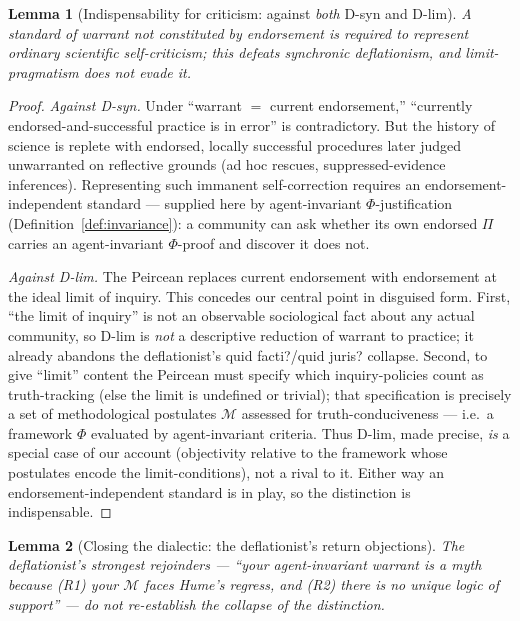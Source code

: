 \documentclass{amsart}
\theoremstyle{definition}
\theoremstyle{plain}
\newtheorem{lemma}{Lemma}
\theoremstyle{remark}
\begin{document}
\begin{lemma}[Indispensability for criticism: against \emph{both} D-syn and
D-lim]\label{lem:criticism}
A standard of warrant not constituted by endorsement is required to represent
ordinary scientific self-criticism; this defeats synchronic deflationism, and
limit-pragmatism does not evade it.
\end{lemma}

\begin{proof}
\emph{Against D-syn.} Under ``warrant $=$ current endorsement,'' ``currently
endorsed-and-successful practice is in error'' is contradictory. But the
history of science is replete with endorsed, locally successful procedures
later judged unwarranted on reflective grounds (ad hoc rescues,
suppressed-evidence inferences). Representing such immanent self-correction
requires an endorsement-independent standard --- supplied here by
agent-invariant $\Phi$-justification (Definition~\ref{def:invariance}): a
community can ask whether its own endorsed $\Pi$ carries an agent-invariant
$\Phi$-proof and discover it does not.

\emph{Against D-lim.} The Peircean replaces current endorsement with
endorsement at the ideal limit of inquiry. This concedes our central point in
disguised form. First, ``the limit of inquiry'' is not an observable
sociological fact about any actual community, so D-lim is \emph{not} a
descriptive reduction of warrant to practice; it already abandons the
deflationist's quid facti?/quid juris? collapse. Second, to give ``limit''
content the Peircean must specify which inquiry-policies count as truth-tracking
(else the limit is undefined or trivial); that specification is precisely a set
of methodological postulates $\mathcal{M}$ assessed for truth-conduciveness ---
i.e.\ a framework $\Phi$ evaluated by agent-invariant criteria. Thus D-lim,
made precise, \emph{is} a special case of our account (objectivity relative to
the framework whose postulates encode the limit-conditions), not a rival to it.
Either way an endorsement-independent standard is in play, so the distinction
is indispensable.
\end{proof}

\begin{lemma}[Closing the dialectic: the deflationist's return objections]
\label{lem:return}
The deflationist's strongest rejoinders --- ``your agent-invariant warrant is a
myth because (R1) your $\mathcal{M}$ faces Hume's regress, and (R2) there is no
unique logic of support'' --- do not re-establish the collapse of the
distinction.
\end{lemma}
\end{document}
